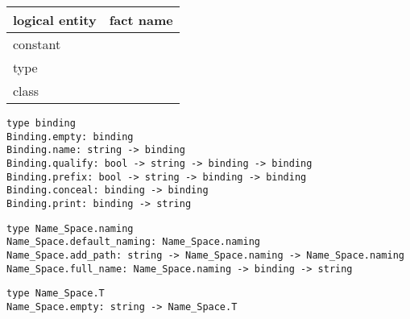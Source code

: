 \begin{isabellebody}
\begin{isamarkuptext}
  \medskip
  \begin{tabular}{ll}
  logical entity & fact name \\\hline
  constant \isa{c} & \isa{c{\isaliteral{2E}{\isachardot}}intro} \\
  type \isa{c} & \isa{c{\isaliteral{5F}{\isacharunderscore}}type{\isaliteral{2E}{\isachardot}}intro} \\
  class \isa{c} & \isa{c{\isaliteral{5F}{\isacharunderscore}}class{\isaliteral{2E}{\isachardot}}intro} \\
  \end{tabular}%
\end{isamarkuptext}%
\isamarkuptrue%
%
\isadelimmlref
%
\endisadelimmlref
%
\isatagmlref
%
\begin{isamarkuptext}%
\begin{mldecls}
  \verb|type binding| \\
  \verb|Binding.empty: binding| \\
  \verb|Binding.name: string -> binding| \\
  \verb|Binding.qualify: bool -> string -> binding -> binding| \\
  \verb|Binding.prefix: bool -> string -> binding -> binding| \\
  \verb|Binding.conceal: binding -> binding| \\
  \verb|Binding.print: binding -> string| \\
  \end{mldecls}
  \begin{mldecls}
  \verb|type Name_Space.naming| \\
  \verb|Name_Space.default_naming: Name_Space.naming| \\
  \verb|Name_Space.add_path: string -> Name_Space.naming -> Name_Space.naming| \\
  \verb|Name_Space.full_name: Name_Space.naming -> binding -> string| \\
  \end{mldecls}
  \begin{mldecls}
  \verb|type Name_Space.T| \\
  \verb|Name_Space.empty: string -> Name_Space.T| \\

\end{mldecls}
\end{isamarkuptext}
\end{isabellebody}
